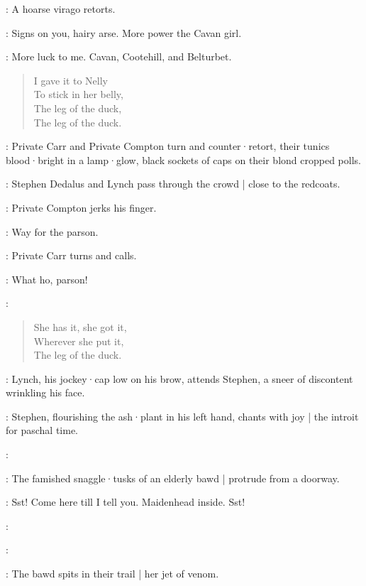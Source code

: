:
A hoarse virago retorts.

\Virago:
Signs on you,
hairy arse.
More power the Cavan girl.

\Cissy:
More luck to me.
Cavan,
Cootehill,
and Belturbet.

\begin{verse}
    I gave it to Nelly\\
    To stick in her belly,\\
    The leg of the duck,\\
    The leg of the duck.
\end{verse}

:
Private Carr and Private Compton turn and counter·retort,
their tunics blood·bright in a lamp·glow,
black sockets of caps on their blond cropped polls.

:
Stephen Dedalus and Lynch pass through the crowd |
close to the redcoats.

:
Private Compton jerks his finger.

\Compton:
Way for the parson.

:
Private Carr turns and calls.

\Carr:
What ho,
parson!

\Cissy:

\begin{verse}
%
    She has it,
        she got it,\\
    Wherever she put it,\\
    The leg of the duck.
\end{verse}

:
Lynch,
his jockey·cap low on his brow,
attends Stephen,
a sneer of discontent wrinkling his face.

:
Stephen,
flourishing the ash·plant in his left hand,
chants with joy |
the introit for paschal time.

\Stephen:

:
The famished snaggle·tusks of an elderly bawd |
protrude from a doorway.

\Bawd:
Sst!
Come here till I tell you.
Maidenhead inside.
Sst!

:

\Stephen:

:
The bawd spits in their trail |
her jet of venom.

